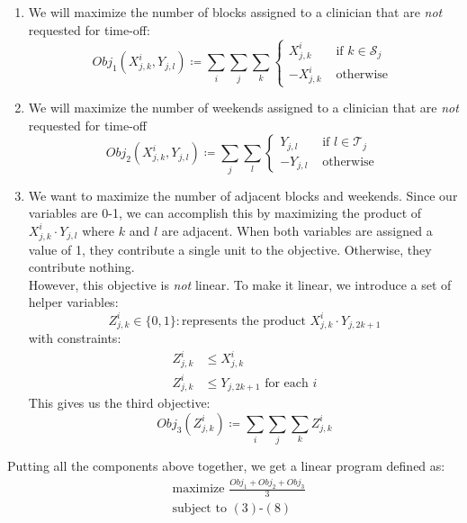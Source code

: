 \documentclass[]{article}
\newcommand{\mc}{\mathcal}
\begin{document}
	\begin{enumerate}
		\item We will maximize the number of blocks assigned to a clinician that are \textit{not} requested for time-off:
			\begin{equation}
				Obj_1\left(X^i_{j, k}, Y_{j, l}\right) \coloneqq \sum_i \sum_j \sum_k
					\begin{cases}
					X^i_{j, k} &\text{ if } k \in \mc{S}_j \\
					-X^i_{j, k} &\text{ otherwise }
					\end{cases}
			\end{equation}
		\item We will maximize the number of weekends assigned to a clinician that are \textit{not} requested for time-off
			\begin{equation}
				Obj_2\left(X^i_{j, k}, Y_{j, l}\right) \coloneqq \sum_j \sum_l 
					\begin{cases}
					Y_{j, l} &\text{ if } l \in \mc{T}_j \\
					-Y_{j, l} &\text{ otherwise }
					\end{cases}
			\end{equation}
		\item We want to maximize the number of adjacent blocks and weekends. Since our variables are 0-1, we can accomplish this by maximizing the product of $X^i_{j, k} \cdot Y_{j, l}$ where $k$ and $l$ are adjacent. When both variables are assigned a value of 1, they contribute a single unit to the objective. Otherwise, they contribute nothing. \\
		However, this objective is \textit{not} linear. To make it linear, we introduce a set of helper variables:
			\begin{equation}
				Z^i_{j, k} \in \{0, 1\}: \text{represents the product }X^i_{j, k} \cdot Y_{j, 2k+1}
			\end{equation}
		with constraints:
			\begin{align}
				Z^i_{j, k} &\leq X^i_{j, k} \\
				Z^i_{j, k} &\leq Y_{j, 2k+1} \text{ for each } i
			\end{align}
		This gives us the third objective:
			\begin{equation}
				Obj_3\left(Z^i_{j, k}\right) \coloneqq \sum_i \sum_j \sum_k Z^i_{j, k}
			\end{equation}
	\end{enumerate}
	Putting all the components above together, we get a linear program defined as:
		\begin{equation}
			\begin{split}
			&\text{maximize } \frac{Obj_1 + Obj_2 + Obj_3}{3} \\
			&\text{subject to } (3)\text{-}(8)
			\end{split}
		\end{equation}
\end{document}
